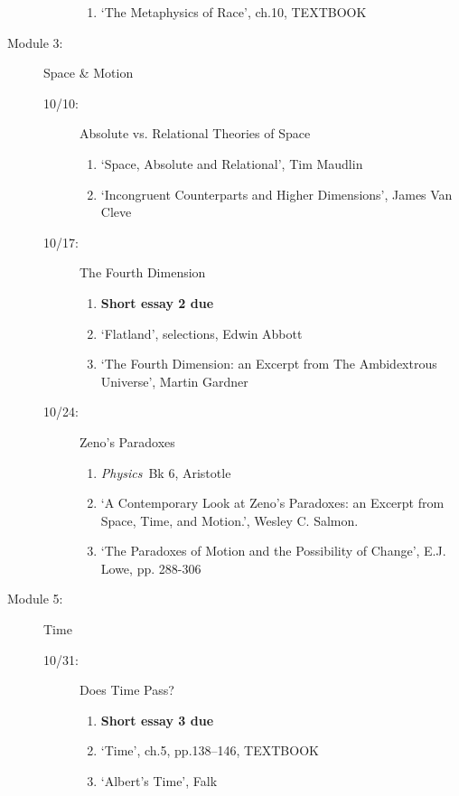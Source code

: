 \documentclass[article,oneside]{memoir}
\begin{document}
\begin{description}
\begin{description}
\begin{enumerate}
\item `The Metaphysics of Race', ch.10, TEXTBOOK

\end{enumerate}

\end{description}


\item[Module 3:] Space \& Motion
\begin{description}
\item[10/10:] Absolute vs. Relational Theories of Space
\begin{enumerate}
\item `Space, Absolute and Relational', Tim Maudlin
\item `Incongruent Counterparts and Higher Dimensions', James Van Cleve
\end{enumerate}

\item[10/17:] The Fourth Dimension
\begin{enumerate} 
\item \textbf{Short essay 2 due}
\item `Flatland', selections, Edwin Abbott 
\item `The Fourth Dimension: an Excerpt from The Ambidextrous Universe', Martin Gardner
\end{enumerate}
\end{description}

\begin{description}
\item [10/24:] Zeno's Paradoxes
\begin{enumerate}
\item \emph{Physics}\ Bk 6, Aristotle
\item `A Contemporary Look at Zeno’s Paradoxes: an Excerpt from Space, Time, and Motion.', Wesley C. Salmon. 
\item `The Paradoxes of Motion and the Possibility of Change', E.J. Lowe, pp. 288-306
\end{enumerate}
\end{description}


\item[Module 5:] Time 
\begin{description}
\item [10/31:] Does Time Pass?
\begin{enumerate}
\item \textbf{Short essay 3 due}
\item `Time', ch.5, pp.138--146, TEXTBOOK
\item `Albert's Time', Falk
\end{enumerate}


\end{description}
\end{description}
\end{document}
